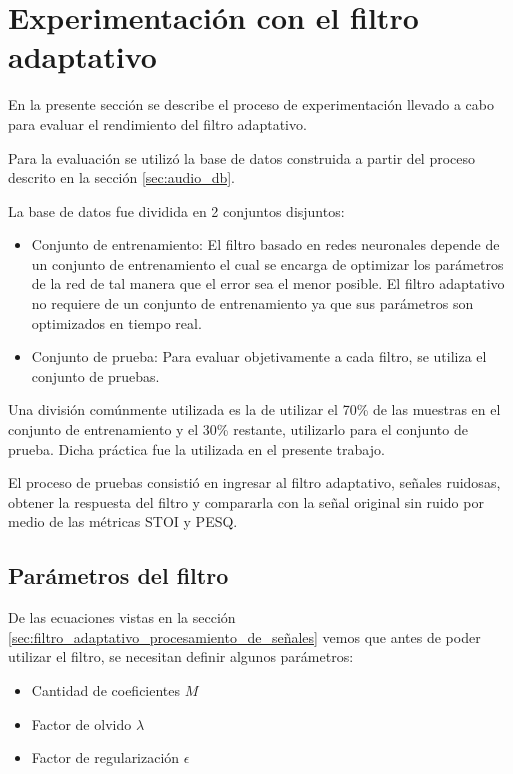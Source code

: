 \section{Experimentación con el filtro adaptativo}

En la presente sección se describe el proceso de experimentación llevado a cabo para evaluar el rendimiento del filtro adaptativo.

Para la evaluación se utilizó la base de datos construida a partir del proceso descrito en la sección \ref{sec:audio_db}.

La base de datos fue dividida en 2 conjuntos disjuntos:

\begin{itemize}
	\item Conjunto de entrenamiento: El filtro basado en redes neuronales depende de un conjunto de entrenamiento el cual se encarga de optimizar los parámetros de la red de tal manera que el error sea el menor posible. El filtro adaptativo no requiere de un conjunto de entrenamiento ya que sus parámetros son optimizados en tiempo real.
	\item Conjunto de prueba: Para evaluar objetivamente a cada filtro, se utiliza el conjunto de pruebas.
\end{itemize}

Una división comúnmente utilizada es la de utilizar el 70\% de las muestras en el conjunto de entrenamiento y el 30\% restante, utilizarlo para el conjunto de prueba. Dicha práctica fue la utilizada en el presente trabajo.

El proceso de pruebas consistió en ingresar al filtro adaptativo, señales ruidosas, obtener la respuesta del filtro y compararla con la señal original sin ruido por medio de las métricas STOI y PESQ.

\subsection{Parámetros del filtro}

De las ecuaciones vistas en la sección \ref{sec:filtro_adaptativo_procesamiento_de_señales} vemos que antes de poder utilizar el filtro, se necesitan definir algunos parámetros:

\begin{itemize}
	\item Cantidad de coeficientes $M$
	\item Factor de olvido $\lambda$ 
	\item Factor de regularización $\epsilon$
\end{itemize}


